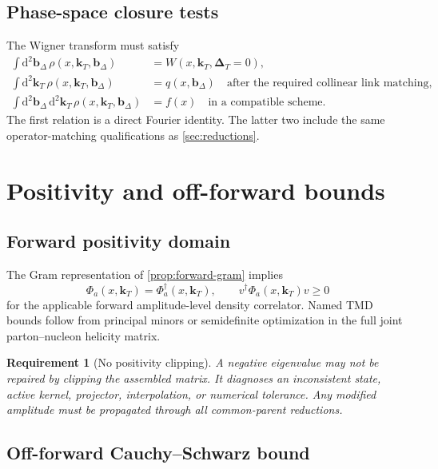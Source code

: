 \documentclass[11pt]{article}
\newtheorem{requirement}[definition]{Requirement}
\newcommand{\kT}{\bm{k}_{T}}
\newcommand{\DT}{\bm{\Delta}_{T}}
\newcommand{\bD}{\bm{b}_{\Delta}}
\newcommand{\dd}{\mathrm{d}}
\begin{document}
\subsection{Phase-space closure tests}

The Wigner transform must satisfy
\begin{align}
 \int\dd^2\bD\,
 \rho(x,\kT,\bD)&=W(x,\kT,\DT=0),
\label{eq:wigner-tmd-marginal}\\
 \int\dd^2\kT\,
 \rho(x,\kT,\bD)&=q(x,\bD)
 \quad\text{after the required collinear link matching},
\label{eq:wigner-impact-marginal}\\
 \int\dd^2\bD\,\dd^2\kT\,
 \rho(x,\kT,\bD)&=f(x)
 \quad\text{in a compatible scheme}.
\label{eq:wigner-pdf-marginal}
\end{align}
The first relation is a direct Fourier identity.  The latter two include the
same operator-matching qualifications as \cref{sec:reductions}.

\section{Positivity and off-forward bounds}
\label{sec:positivity}

\subsection{Forward positivity domain}

The Gram representation of \cref{prop:forward-gram} implies
\begin{equation}
 \Phi_a(x,\kT)=\Phi_a^\dagger(x,\kT),
 \qquad
 v^\dagger\Phi_a(x,\kT)v\ge0
\label{eq:forward-psd}
\end{equation}
for the applicable forward amplitude-level density correlator.  Named TMD
bounds follow from principal minors or semidefinite optimization in the full
joint parton--nucleon helicity matrix.

\begin{requirement}[No positivity clipping]
\label{req:no-positivity-clipping}
A negative eigenvalue may not be repaired by clipping the assembled matrix.
It diagnoses an inconsistent state, active kernel, projector, interpolation,
or numerical tolerance.  Any modified amplitude must be propagated through
all common-parent reductions.
\end{requirement}

\subsection{Off-forward Cauchy--Schwarz bound}
\end{document}
